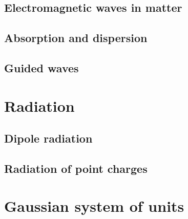 \section{Electromagnetic waves in matter}
\section{Absorption and dispersion}
\section{Guided waves}

\chapter{Radiation}
\section{Dipole radiation}
\section{Radiation of point charges}


\chapter{Gaussian system of units}